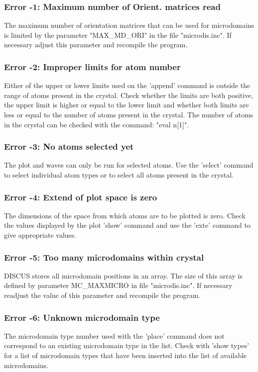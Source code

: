 \subsubsection{Error -1: Maximum number of Orient. matrices read}
\par
The maximum number of orientation matrices that can be used for 
microdomains is limited by the parameter "MAX\_MD\_ORI" in the file 
"microdis.inc". If necessary adjust this parameter and recompile the 
program. 
\subsubsection{Error -2: Improper limits for atom number}
\par
Either of the upper or lower limits used on the 'append' command is 
outside the range of atoms present in the crystal. Check whether 
the limits are both positive, the upper limit is higher or equal to 
the lower limit and whether both limits are less or equal to the 
number of atoms present in the crystal. The number of atoms in the 
crystal can be checked with the command: "eval n[1]". 
\subsubsection{Error -3: No atoms selected yet}
\par
The plot and waves can only be run for selected atoms. Use the 'select' 
command to select individual atom types or to select all atoms present 
in the crystal. 
\subsubsection{Error -4: Extend of plot space is zero}
\par
The dimensions of the space from which atoms are to be plotted is zero. 
Check the values displayed by the plot 'show' command and use the 
'exte' command to give appropriate values. 
\subsubsection{Error -5: Too many microdomains within crystal}
\par
DISCUS stores all microdomain positions in an array. The size of 
this array is defined by parameter MC\_MAXMICRO in file "microdis.inc". 
If necessary readjust the value of this parameter and recompile the 
program. 
\subsubsection{Error -6: Unknown microdomain type}
\par
The microdomain type number used with the 'place' command does not 
correspond to an existing microdomain type in the list. Check with 
'show types' for a list of microdomain types that have been inserted 
into the list of available microdomains. 
